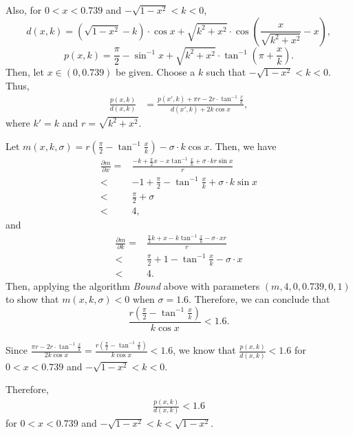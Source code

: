 Also, for  $0<x<0.739$ and $-\sqrt{1-x^2}<k<0$,
\[d(x, k) = \left(\sqrt{1- x^2} - k\right)\cdot\cos{x} + \sqrt{k^2 + x^2}\cdot\cos{\left(\frac{x}{\sqrt{k^2 + x^2}} - x\right)},\]
\[p(x, k) = \frac{\pi}{2} - \sin^{-1}{x} + \sqrt{k^2+x^2}\cdot\tan^{-1}{\left(\pi+\frac{x}{k}\right )}.\]
Then, let $x\in (0, 0.739)$ be given. Choose a $k$ such that $-\sqrt{1-x^2}< k <0$. Thus, 
\begin{align*}
  \frac{p(x, k)}{d(x, k)} & =  \frac{p(x', k)+\pi r-2 r\cdot\tan^{-1}\frac{x}{k}}{d(x', k)+2k\cos x} ,
\end{align*}
where $k' = k$ and $r = \sqrt{k^2+x^2}$.

Let $m(x, k, \sigma) =r (\frac{\pi}{2}- \tan^{-1}\frac{x}{k}) - \sigma\cdot k\cos x$. Then, we have
\begin{align*}
    \frac{\partial m}{\partial x}  = &\frac{-k+\frac{\pi}{2}x-x\tan^{-1}\frac{x}{k}+\sigma\cdot k r\sin x}{r}\\
    < & -1+\frac{\pi}{2}-\tan^{-1}\frac{x}{k}+\sigma\cdot k\sin x\\
    < & \frac{\pi}{2} + \sigma\\
    < & 4,
\end{align*}
and
\begin{align*}
   \frac{\partial m}{\partial k}  = &\frac{\frac{\pi}{2}k+x-k\tan^{-1}\frac{x}{k}-\sigma\cdot x r}{r}\\
   < & \frac{\pi}{2}+1-\tan^{-1}\frac{x}{k}-\sigma\cdot x\\
   < & 4.
\end{align*}
Then, applying the algorithm \textit{Bound} above with parameters $(m, 4, 0, 0.739, 0, 1)$ to show that $m(x, k, \sigma)<0$ when $\sigma = 1.6$. Therefore, we can conclude that 
\[\frac{r (\frac{\pi}{2}- \tan^{-1}\frac{x}{k})}{k\cos x} < 1.6.\]

Since $\frac{\pi r-2 r\cdot\tan^{-1}\frac{x}{k}}{2k\cos x} =  \frac{r (\frac{\pi}{2}- \tan^{-1}\frac{x}{k})}{k\cos x} < 1.6$, we know that $\frac{p(x, k)}{d(x, k)} <1.6$ for  $0<x<0.739$ and $-\sqrt{1-x^2}<k<0$. 


Therefore, 
\begin{align*}
  \frac{p(x, k)}{d(x, k)} <1.6
\end{align*}
for  $0<x<0.739$ and $-\sqrt{1-x^2}<k<\sqrt{1-x^2}$. 